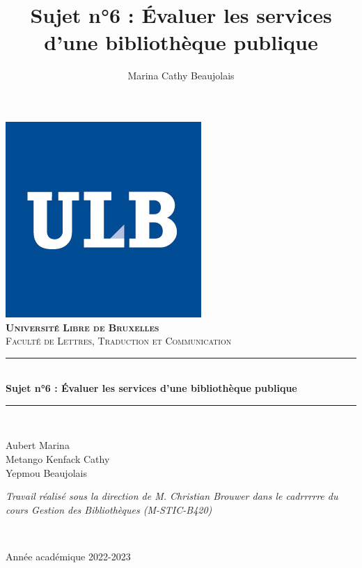 \documentclass[french,a4paper,12pt]{article}
\title{Sujet n°6 : ​Évaluer les services​ d’une bibliothèque publique} %
\author{Marina Cathy Beaujolais}
\newcommand{\HRule}{\rule{\linewidth}{0.5mm}}
\begin{document}
\begin{titlepage}
  \begin{sffamily}
  \begin{center}
     \includegraphics[scale=0.25]{logoulb.JPG}~\\[1.5cm]

    \textsc{\bfseries \LARGE Université Libre de Bruxelles }\\[0.5cm]
    \textsc{\Large Faculté de Lettres, Traduction et Communication}\\[6cm]

    \HRule \\[0.4cm]
    { \huge \bfseries Sujet n°6 : ​Évaluer les services​ d’une bibliothèque publique\\[0.4cm] }

    \HRule \\[4cm]
    \begin{minipage}{0.4\textwidth}
      \begin{flushleft} \large
        Aubert Marina \\
        Metango Kenfack Cathy \\
        Yepmou Beaujolais \\
        
      \end{flushleft}
    \end{minipage}
    \begin{minipage}{0.4\textwidth}
      \begin{flushright} \large
        \emph{Travail réalisé sous la direction de M. Christian Brouwer dans le cadrrrrre du cours Gestion des Bibliothèques (M-STIC-B420)} 
      \end{flushright}
    \end{minipage} \\ [2cm]

    \vfill

    {\large {} Année académique 2022-2023}

  \end{center}
  \end{sffamily}
\end{titlepage}
\end{document}
